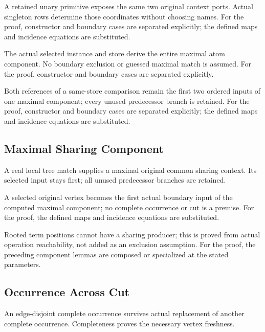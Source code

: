 A retained unary primitive exposes the same two original context ports. Actual singleton rows determine those coordinates without choosing names.
For the proof, constructor and boundary cases are separated explicitly; the defined maps and incidence equations are substituted.
\par{}

The actual selected instance and store derive the entire maximal atom component. No boundary exclusion or guessed maximal match is assumed.
For the proof, constructor and boundary cases are separated explicitly.
\par{}

Both references of a same-store comparison remain the first two ordered inputs of one maximal component; every unused predecessor branch is retained.
For the proof, constructor and boundary cases are separated explicitly; the defined maps and incidence equations are substituted.
\par{}

\subsection{Maximal Sharing Component}
A real local tree match supplies a maximal original common sharing context. Its selected input stays first; all unused predecessor branches are retained.

A selected original vertex becomes the first actual boundary input of the computed maximal component; no complete occurrence or cut is a premise.
For the proof, the defined maps and incidence equations are substituted.
\par{}

Rooted term positions cannot have a sharing producer; this is proved from actual operation reachability, not added as an exclusion assumption.
For the proof, the preceding component lemmas are composed or specialized at the stated parameters.
\par{}

\subsection{Occurrence Across Cut}
An edge-disjoint complete occurrence survives actual replacement of another complete occurrence. Completeness proves the necessary vertex freshness.

